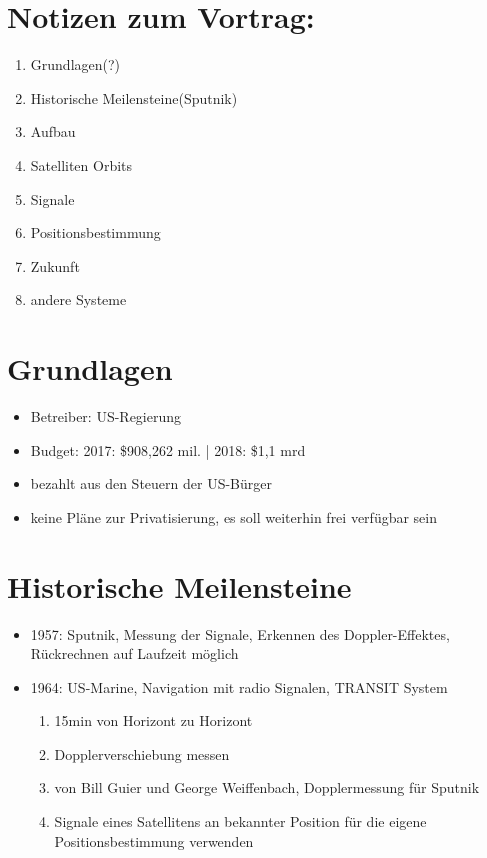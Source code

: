 \documentclass{scrartcl}
\begin{document}
    \section{Notizen zum Vortrag:}
    \begin{enumerate}
        \item Grundlagen(?)
        \item Historische Meilensteine(Sputnik)
        \item Aufbau
        \item Satelliten Orbits
        \item Signale
        \item Positionsbestimmung
        \item Zukunft
        \item andere Systeme
    \end{enumerate}
    \section{Grundlagen}
    \begin{itemize}
        \item Betreiber: US-Regierung
        \item Budget: 2017: \$908,262 mil. | 2018: \$1,1 mrd
        \item bezahlt aus den Steuern der US-Bürger
        \item keine Pläne zur Privatisierung, es soll weiterhin frei verfügbar sein
    \end{itemize}
    \section{Historische Meilensteine}
    \begin{itemize}
      \item 1957: Sputnik, Messung der Signale, Erkennen des Doppler-Effektes, Rückrechnen auf Laufzeit möglich
      \item 1964: US-Marine, Navigation mit radio Signalen, TRANSIT System
      \begin{enumerate}
          \item 15min von Horizont zu Horizont
          \item Dopplerverschiebung messen
          \item von Bill Guier und George Weiffenbach, Dopplermessung für Sputnik
          \item Signale eines Satellitens an bekannter Position für die eigene Positionsbestimmung verwenden
      \end{enumerate}
    \end{itemize}
\end{document}
